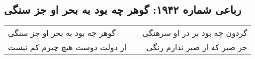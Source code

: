 \begin{center}
\section*{رباعی شماره ۱۹۴۲: گوهر چه بود به بحر او جز سنگی}
\label{sec:1942}
\begin{longtable}{l p{0.5cm} r}
گوهر چه بود به بحر او جز سنگی
&&
گردون چه بود بر در او سرهنگی
\\
از دولت دوست هیچ چیزم کم نیست
&&
جز صبر که از صبر ندارم رنگی
\\
\end{longtable}
\end{center}
